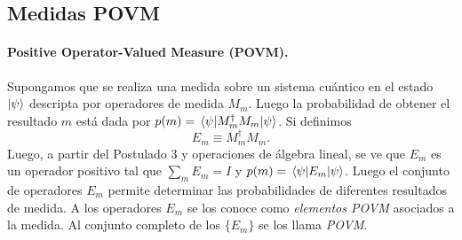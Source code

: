 \subsection{Medidas POVM}

\paragraph{Positive Operator-Valued Measure (POVM).} 
Supongamos que se realiza una medida sobre un sistema cuántico en el estado $\ket{\psi}$ 
descripta por operadores de medida $M_m$.
Luego la probabilidad de obtener el resultado $m$ está dada por
$p(m) = \mel{\psi}{M_m^{\dagger}M_m}{\psi}$. Si definimos
\begin{equation*}
  E_m \equiv M_m^{\dagger}M_m.
\end{equation*} Luego, a partir del Postulado 3 y operaciones de álgebra lineal, se ve que $E_m$ 
es un operador positivo tal que $\sum_mE_m = I$ y $p(m) = \mel{\psi}{E_m}{\psi}$.
Luego el conjunto de operadores $E_m$ permite determinar las
probabilidades de diferentes resultados de medida. 
A los operadores $E_m$ se los conoce como \emph{elementos POVM} asociados
a la medida. Al conjunto completo de los $\{E_m\}$ se los llama \emph{POVM}.




